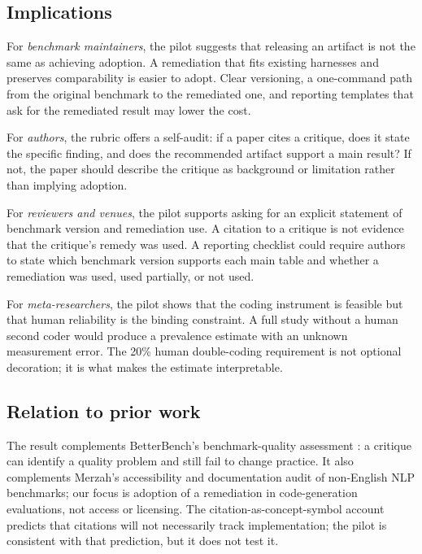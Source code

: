\documentclass[11pt,a4paper]{article}
\begin{document}
\subsection{Implications}

For \emph{benchmark maintainers}, the pilot suggests that releasing an artifact is not the same as achieving adoption. A remediation that fits existing harnesses and preserves comparability is easier to adopt. Clear versioning, a one-command path from the original benchmark to the remediated one, and reporting templates that ask for the remediated result may lower the cost.

For \emph{authors}, the rubric offers a self-audit: if a paper cites a critique, does it state the specific finding, and does the recommended artifact support a main result? If not, the paper should describe the critique as background or limitation rather than implying adoption.

For \emph{reviewers and venues}, the pilot supports asking for an explicit statement of benchmark version and remediation use. A citation to a critique is not evidence that the critique's remedy was used. A reporting checklist could require authors to state which benchmark version supports each main table and whether a remediation was used, used partially, or not used.

For \emph{meta-researchers}, the pilot shows that the coding instrument is feasible but that human reliability is the binding constraint. A full study without a human second coder would produce a prevalence estimate with an unknown measurement error. The 20\% human double-coding requirement is not optional decoration; it is what makes the estimate interpretable.

\subsection{Relation to prior work}

The result complements BetterBench's benchmark-quality assessment \citep{reuel2024}: a critique can identify a quality problem and still fail to change practice. It also complements Merzah's \citeyearpar{merzah2026} accessibility and documentation audit of non-English NLP benchmarks; our focus is adoption of a remediation in code-generation evaluations, not access or licensing. The citation-as-concept-symbol account \citep{small1978} predicts that citations will not necessarily track implementation; the pilot is consistent with that prediction, but it does not test it.
\end{document}
